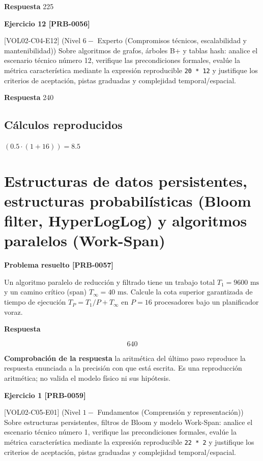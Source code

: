 \documentclass{book}
\begin{document}
\noindent\textbf{Respuesta} 225

\noindent\textbf{Ejercicio 12 [PRB-0056]}

[VOL02-C04-E12] (Nivel \(6 -\) Experto (Compromisos técnicos, escalabilidad y mantenibilidad)) Sobre algoritmos de grafos, árboles B+ y tablas hash: analice el escenario técnico número 12, verifique las precondiciones formales, evalúe la métrica característica mediante la expresión reproducible \texttt{20 * 12} y justifique los criterios de aceptación, pistas graduadas y complejidad temporal/espacial.

\noindent\textbf{Respuesta} 240

\subsection*{Cálculos reproducidos}

\(\left(0.5\cdot \left(1+16\right)\right) = 8.5\)

\section{Estructuras de datos persistentes, estructuras probabilísticas (Bloom filter, HyperLogLog) y algoritmos paralelos (Work-Span)}

\noindent\textbf{Problema resuelto [PRB-0057]}

Un algoritmo paralelo de reducción y filtrado tiene un trabajo total \(T_1 = 9600\text{ ms}\) y un camino crítico (span) \(T_\infty = 40\text{ ms}\). Calcule la cota superior garantizada de tiempo de ejecución \(T_P = T_1 / P + T_\infty\) en \(P = 16\) procesadores bajo un planificador voraz.

\noindent\textbf{Respuesta}

\[
640
\]

\noindent\textbf{Comprobación de la respuesta} la aritmética del último paso reproduce la respuesta enunciada a la precisión con que está escrita. Es una reproducción aritmética; no valida el modelo físico ni sus hipótesis.

\noindent\textbf{Ejercicio 1 [PRB-0059]}

[VOL02-C05-E01] (Nivel \(1 -\) Fundamentos (Comprensión y representación)) Sobre estructuras persistentes, filtros de Bloom y modelo Work-Span: analice el escenario técnico número 1, verifique las precondiciones formales, evalúe la métrica característica mediante la expresión reproducible \texttt{22 * 2} y justifique los criterios de aceptación, pistas graduadas y complejidad temporal/espacial.
\end{document}
